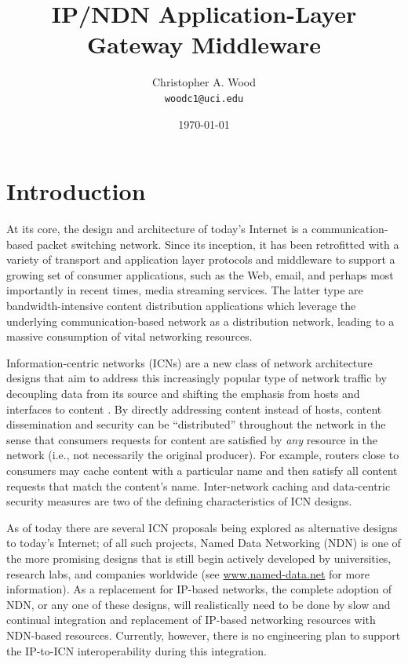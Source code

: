 \documentclass[10pt]{article}
\begin{document}
\title{IP/NDN Application-Layer Gateway Middleware}
\author{Christopher A. Wood \\ {\tt woodc1@uci.edu}}
\date{\today}
\maketitle


\section{Introduction}
At its core, the design and architecture of today's Internet is a communication-based packet switching network. Since its inception, it has been retrofitted with a variety of transport and application layer protocols and middleware to support a growing set of consumer applications, such as the Web, email, and perhaps most importantly in recent times, media streaming services. The latter type are bandwidth-intensive content distribution applications which leverage the underlying communication-based network as a distribution network, leading to a massive consumption of vital networking resources. 

Information-centric networks (ICNs) are a new class of network architecture designs that aim to address this increasingly popular type of network traffic by decoupling data from its source and shifting the emphasis from hosts and interfaces to content \cite{first}. By directly addressing content instead of hosts, content dissemination and security can be ``distributed'' throughout the network in the sense that consumers requests for content are satisfied by \emph{any} resource in the network (i.e., not necessarily the original producer). For example, routers close to consumers may cache content with a particular name and then satisfy all content requests that match the content's name. Inter-network caching and data-centric security measures are two of the defining characteristics of ICN designs. 

As of today there are several ICN proposals being explored as alternative designs to today's Internet; of all such projects, Named Data Networking (NDN) \cite{NDNtech} is one of the more promising designs that is still begin actively developed by universities, research labs, and companies worldwide (see \url{www.named-data.net} for more information). As a replacement for IP-based networks, the complete adoption of NDN, or any one of these designs, will realistically need to be done by slow and continual integration and replacement of IP-based networking resources with NDN-based resources. Currently, however, there is no engineering plan to support the IP-to-ICN interoperability during this integration. 
\end{document}
